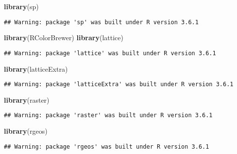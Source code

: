 \documentclass[]{article}
\newenvironment{Shaded}{\begin{snugshade}}{\end{snugshade}}
\newcommand{\KeywordTok}[1]{\textcolor[rgb]{0.13,0.29,0.53}{\textbf{#1}}}
\newcommand{\NormalTok}[1]{#1}
\begin{document}
\begin{Shaded}
\begin{Highlighting}[]
\KeywordTok{library}\NormalTok{(sp)}
\end{Highlighting}
\end{Shaded}

\begin{verbatim}
## Warning: package 'sp' was built under R version 3.6.1
\end{verbatim}

\begin{Shaded}
\begin{Highlighting}[]
\KeywordTok{library}\NormalTok{(RColorBrewer)}
\KeywordTok{library}\NormalTok{(lattice)}
\end{Highlighting}
\end{Shaded}

\begin{verbatim}
## Warning: package 'lattice' was built under R version 3.6.1
\end{verbatim}

\begin{Shaded}
\begin{Highlighting}[]
\KeywordTok{library}\NormalTok{(latticeExtra)}
\end{Highlighting}
\end{Shaded}

\begin{verbatim}
## Warning: package 'latticeExtra' was built under R version 3.6.1
\end{verbatim}

\begin{Shaded}
\begin{Highlighting}[]
\KeywordTok{library}\NormalTok{(raster)}
\end{Highlighting}
\end{Shaded}

\begin{verbatim}
## Warning: package 'raster' was built under R version 3.6.1
\end{verbatim}

\begin{Shaded}
\begin{Highlighting}[]
\KeywordTok{library}\NormalTok{(rgeos)}
\end{Highlighting}
\end{Shaded}

\begin{verbatim}
## Warning: package 'rgeos' was built under R version 3.6.1
\end{verbatim}
\end{document}
